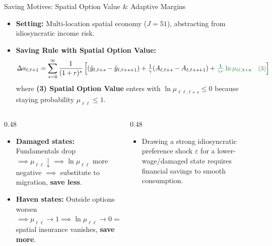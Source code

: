 \documentclass[aspectratio=169, 10pt]{beamer}
\begin{document}
\begin{frame}{Saving Motives: Spatial Option Value \& Adaptive Margins \hfill \hyperlink{backup:ushape}{\scriptsize{}}}\label{main:saving_option}
    \begin{itemize}\small\setlength{\itemsep}{2pt}
        \item \textbf{Setting:} Multi-location spatial economy ($J = 51$), abstracting from idiosyncratic income risk.
        \item \textbf{Saving Rule with Spatial Option Value:}
        \begin{equation}
        \Delta a_{\ell, t+1} = \sum_{s=0}^{\infty} \frac{1}{(1+r)^s} \left[ (\tilde{y}_{\ell, t+s} - \tilde{y}_{\ell, t+s+1}) + \tfrac{1}{\gamma} (A_{\ell, t+s} - A_{\ell, t+s+1}) + \textcolor{emerald}{\mathbf{\tfrac{1}{\gamma \nu} \ln \mu_{\ell \ell, t+s} \quad \text{\small (3)}}} \right]
        \label{eq:saving_spatial}
        \end{equation}
        where \textcolor{emerald}{\textbf{(3) Spatial Option Value}} enters with $\ln \mu_{\ell\ell,t+s} \le 0$ because staying probability $\mu_{\ell\ell} \le 1$.
    \end{itemize}
    \vspace{0.04cm}
    \begin{columns}[T]
        \begin{column}{0.48\textwidth}
            \begin{tcolorbox}[leafbox, title=Substitutability (Spatial Insurance)]
                \scriptsize
                \begin{itemize}\setlength{\itemsep}{1pt}
                    \item \textbf{Damaged states:} Fundamentals drop $\implies \mu_{\ell\ell} \downarrow \implies \ln \mu_{\ell\ell}$ more negative $\implies$ substitute to migration, \textbf{save less}.
                    \item \textbf{Haven states:} Outside options worsen $\implies \mu_{\ell\ell} \to 1 \implies \ln \mu_{\ell\ell} \to 0 \implies$ spatial insurance vanishes, \textbf{save more}.
                \end{itemize}
            \end{tcolorbox}
        \end{column}
        \begin{column}{0.48\textwidth}
            \begin{tcolorbox}[leafbox, title=Complementarity (Taste Buffering)]
                \scriptsize
                \begin{itemize}\setlength{\itemsep}{1pt}
                    \item Drawing a strong idiosyncratic preference shock $\varepsilon$ for a lower-wage/damaged state requires financial savings to smooth consumption.
                \end{itemize}
            \end{tcolorbox}
        \end{column}
    \end{columns}
\end{frame}
\end{document}

